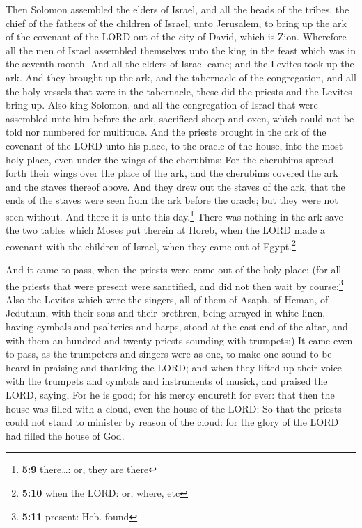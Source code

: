  Then Solomon assembled the elders of Israel, and all the
heads of the tribes, the chief of the fathers of the children of Israel,
unto Jerusalem, to bring up the ark of the covenant of the LORD out of
the city of David, which is Zion.  Wherefore all the men
of Israel assembled themselves unto the king in the feast which was in
the seventh month.  And all the elders of Israel came; and
the Levites took up the ark.  And they brought up the ark,
and the tabernacle of the congregation, and all the holy vessels that
were in the tabernacle, these did the priests and the Levites bring up.
 Also king Solomon, and all the congregation of Israel
that were assembled unto him before the ark, sacrificed sheep and oxen,
which could not be told nor numbered for multitude.  And
the priests brought in the ark of the covenant of the LORD unto his
place, to the oracle of the house, into the most holy place, even under
the wings of the cherubims:  For the cherubims spread
forth their wings over the place of the ark, and the cherubims covered
the ark and the staves thereof above.  And they drew out
the staves of the ark, that the ends of the staves were seen from the
ark before the oracle; but they were not seen without. And there it is
unto this day.\footnote{\textbf{5:9} there\ldots: or, they are there}
 There was nothing in the ark save the two tables which
Moses put therein at Horeb, when the LORD made a covenant with the
children of Israel, when they came out of Egypt.\footnote{\textbf{5:10}
  when the LORD: or, where, etc}

 And it came to pass, when the priests were come out of
the holy place: (for all the priests that were present were sanctified,
and did not then wait by course:\footnote{\textbf{5:11} present: Heb.
  found}  Also the Levites which were the singers, all of
them of Asaph, of Heman, of Jeduthun, with their sons and their
brethren, being arrayed in white linen, having cymbals and psalteries
and harps, stood at the east end of the altar, and with them an hundred
and twenty priests sounding with trumpets:)  It came even
to pass, as the trumpeters and singers were as one, to make one sound to
be heard in praising and thanking the LORD; and when they lifted up
their voice with the trumpets and cymbals and instruments of musick, and
praised the LORD, saying, For he is good; for his mercy endureth for
ever: that then the house was filled with a cloud, even the house of the
LORD;  So that the priests could not stand to minister by
reason of the cloud: for the glory of the LORD had filled the house of
God.

